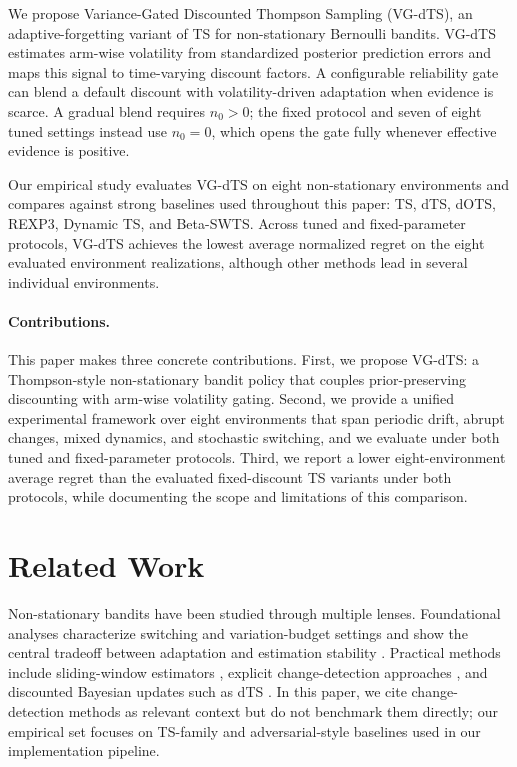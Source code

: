 \documentclass{article}
\begin{document}
We propose Variance-Gated Discounted Thompson Sampling (VG-dTS), an adaptive-forgetting variant of TS for non-stationary Bernoulli bandits. VG-dTS estimates arm-wise volatility from standardized posterior prediction errors and maps this signal to time-varying discount factors. A configurable reliability gate can blend a default discount with volatility-driven adaptation when evidence is scarce. A gradual blend requires $n_0>0$; the fixed protocol and seven of eight tuned settings instead use $n_0=0$, which opens the gate fully whenever effective evidence is positive.

Our empirical study evaluates VG-dTS on eight non-stationary environments and compares against strong baselines used throughout this paper: TS, dTS, dOTS, REXP3, Dynamic TS, and Beta-SWTS. Across tuned and fixed-parameter protocols, VG-dTS achieves the lowest average normalized regret on the eight evaluated environment realizations, although other methods lead in several individual environments.

\paragraph{Contributions.}
This paper makes three concrete contributions.
First, we propose VG-dTS: a Thompson-style non-stationary bandit policy that couples prior-preserving discounting with arm-wise volatility gating.
Second, we provide a unified experimental framework over eight environments that span periodic drift, abrupt changes, mixed dynamics, and stochastic switching, and we evaluate under both tuned and fixed-parameter protocols.
Third, we report a lower eight-environment average regret than the evaluated fixed-discount TS variants under both protocols, while documenting the scope and limitations of this comparison.

\section{Related Work}
Non-stationary bandits have been studied through multiple lenses. Foundational analyses characterize switching and variation-budget settings and show the central tradeoff between adaptation and estimation stability \cite{garivier2011switching,hartland2007,besbes2014}. Practical methods include sliding-window estimators \cite{trovo2020}, explicit change-detection approaches \cite{liu2018change}, and discounted Bayesian updates such as dTS \cite{raj2017taming}.
In this paper, we cite change-detection methods as relevant context but do not benchmark them directly; our empirical set focuses on TS-family and adversarial-style baselines used in our implementation pipeline.
\end{document}
